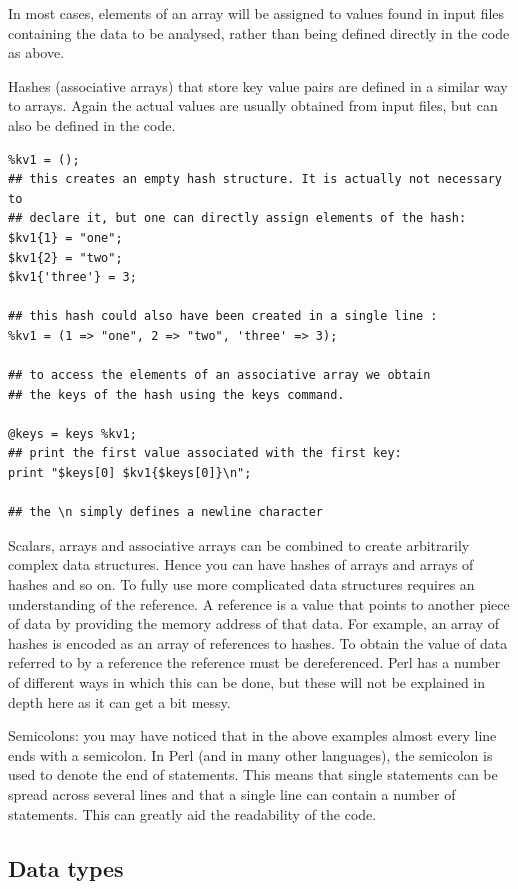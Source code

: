 \documentclass[11pt]{article}
\begin{document}
In most cases, elements of an array will be assigned to values found in
input files containing the data to be analysed, rather than being
defined directly in the code as above.

Hashes (associative arrays) that store key value pairs are defined in a
similar way to arrays. Again the actual values are usually obtained from
input files, but can also be defined in the code.

\begin{verbatim}
%kv1 = ();
## this creates an empty hash structure. It is actually not necessary to
## declare it, but one can directly assign elements of the hash:
$kv1{1} = "one";
$kv1{2} = "two";
$kv1{'three'} = 3;

## this hash could also have been created in a single line :
%kv1 = (1 => "one", 2 => "two", 'three' => 3);

## to access the elements of an associative array we obtain
## the keys of the hash using the keys command.

@keys = keys %kv1;
## print the first value associated with the first key:
print "$keys[0] $kv1{$keys[0]}\n";

## the \n simply defines a newline character
\end{verbatim}


Scalars, arrays and associative arrays can be combined to create
arbitrarily complex data structures. Hence you can have hashes of arrays
and arrays of hashes and so on. To fully use more complicated data
structures requires an understanding of the reference. A reference is a
value that points to another piece of data by providing the memory
address of that data. For example, an array of hashes is encoded as an
array of references to hashes. To obtain the value of data referred to
by a reference the reference must be dereferenced. Perl has
a number of different ways in which this can be done, but these will not
be explained in depth here as it can get a bit messy. 

Semicolons: you may have noticed that in the above examples almost every
line ends with a semicolon. In Perl (and in many other languages), the
semicolon is used to denote the end of statements. This means
that single statements can be spread across several lines and that a
single line can contain a number of statements. This can greatly aid the
readability of the code.

\subsection{Data types}
\label{sec-5-3}
\end{document}
